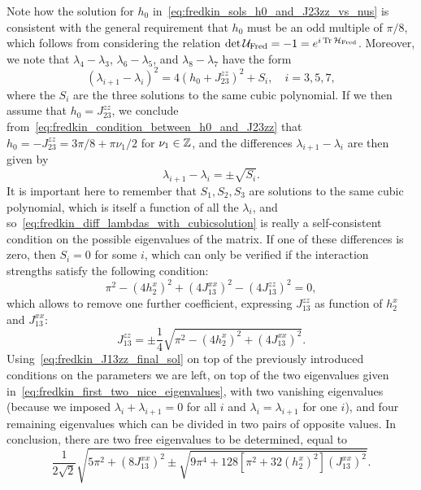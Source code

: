 Note how the solution for $h_0$ in~\cref{eq:fredkin_sols_h0_and_J23zz_vs_nus} is consistent with the general requirement that $h_0$ must be an odd multiple of $\pi/8$, which follows from considering the relation $\det\UFred=-1=e^{i\Tr\HFred}$.
Moreover, we note that $\lambda_4-\lambda_3$, $\lambda_6-\lambda_5$, and $\lambda_8-\lambda_7$ have the form
\begin{equation}
    (\lambda_{i+1}-\lambda_i)^2 =
    4(h_0 + J_{23}^{zz})^2 + S_i,
    \quad i=3,5,7,
\end{equation}
where the $S_i$ are the three solutions to the same cubic polynomial.
If we then assume that $h_0=J_{23}^{zz}$, we conclude from~\cref{eq:fredkin_condition_between_h0_and_J23zz} that
$h_0=-J_{23}^{zz}=3\pi/8+\pi \nu_1/2$ for $\nu_1\in\mathbb{Z}$, and the differences $\lambda_{i+1}-\lambda_i$ are then given by
\begin{equation}
    \lambda_{i+1} - \lambda_i = \pm \sqrt{S_i}.
    \label{eq:fredkin_diff_lambdas_with_cubicsolution}
\end{equation}
It is important here to remember that $S_1, S_2, S_3$ are solutions to the same cubic polynomial, which is itself a function of all the $\lambda_i$, and so~\cref{eq:fredkin_diff_lambdas_with_cubicsolution} is really a self-consistent condition on the possible eigenvalues of the matrix.
If one of these differences is zero, then $S_i=0$ for some $i$, which can only be verified if the interaction strengths satisfy the following condition:
\begin{equation}
    \pi^2
    - (4h_2^x)^2
    + (4 J_{13}^{xx})^2
    - (4 J_{13}^{zz})^2 = 0,
\end{equation}
which allows to remove one further coefficient, expressing $J_{13}^{zz}$ as function of $h_2^x$ and $J_{13}^{xx}$:
\begin{equation}
    J_{13}^{zz} = \pm\frac{1}{4}\sqrt{
        \pi^2 - (4 h_2^x)^2 + (4 J_{13}^{xx})^2
    }.
    \label{eq:fredkin_J13zz_final_sol}
\end{equation}
Using~\cref{eq:fredkin_J13zz_final_sol} on top of the previously introduced conditions on the parameters we are left, on top of the two eigenvalues given in~\cref{eq:fredkin_first_two_nice_eigenvalues}, with two vanishing eigenvalues (because we imposed $\lambda_i+\lambda_{i+1}=0$ for all $i$ and $\lambda_i=\lambda_{i+1}$ for one $i$), and four remaining eigenvalues which can be divided in two pairs of opposite values.
In conclusion, there are two free eigenvalues to be determined, equal to
\begin{equation}
    \frac{1}{2\sqrt2}
    \sqrt{
        5\pi^2 + (8 J_{13}^{xx})^2
        \pm
        \sqrt{
            9\pi^4 + 128[\pi^2 + 32 (h_2^x)^2] (J_{13}^{xx})^2
        }
    }.
\end{equation}

